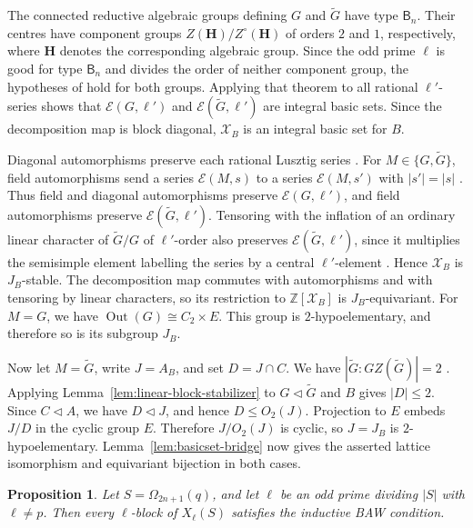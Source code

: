 \documentclass[10pt]{amsart}
\newtheorem{proposition}[theorem]{Proposition}
\theoremstyle{definition}
\renewcommand{\leq}{\leqslant}
\let\oldendproof\endproof
\renewenvironment{proof}[1][\proofname]{%
  \oldproof[\bfseries #1]%
}{\oldendproof}
\DeclareMathOperator{\Out}{Out}
\numberwithin{equation}{section}
\numberwithin{table}{section}
\begin{document}
\begin{proof}
The connected reductive algebraic groups defining $G$ and $\widetilde G$
have type $\mathsf B_n$.  Their centres have component groups
$Z(\mathbf H)/Z^\circ(\mathbf H)$ of orders $2$ and $1$, respectively,
where $\mathbf H$ denotes the corresponding algebraic group.
Since the odd prime $\ell$ is good for type $\mathsf B_n$ and
divides the order of neither component group, the hypotheses
of \cite[Theorem~2.3]{FengLiZhang2022TypeB} hold for both groups.  Applying that theorem to all rational $\ell'$-series
shows that $\mathcal E(G,\ell')$ and $\mathcal E(\widetilde G,\ell')$
are integral basic sets.  Since the decomposition map is block diagonal,
$\mathcal X_B$ is an integral basic set for $B$.

Diagonal automorphisms preserve each rational Lusztig series
\cite[Proposition~15.6(i)]{CabanesEnguehard2004}. For
$M\in\{G,\widetilde G\}$, field automorphisms send a series
$\mathcal E(M,s)$ to a series $\mathcal E(M,s')$ with $|s'|=|s|$
\cite[Proposition~7.2]{Taylor2018Automorphisms}. Thus field and diagonal
automorphisms preserve $\mathcal E(G,\ell')$, and field automorphisms
preserve $\mathcal E(\widetilde G,\ell')$.
Tensoring with the inflation of an ordinary linear character of
$\widetilde G/G$ of $\ell'$-order also preserves
$\mathcal E(\widetilde G,\ell')$, since it multiplies the semisimple
element labelling the series by a central $\ell'$-element
\cite[Theorem~4.7.1(3)]{GeckMalle2020}.
Hence $\mathcal X_B$ is $J_B$-stable.  The decomposition map commutes
with automorphisms and with tensoring by linear characters, so its
restriction to $\mathbb Z[\mathcal X_B]$ is $J_B$-equivariant.
For $M=G$, we have
$\Out(G)\cong C_2\times E$.  This group is $2$-hypoelementary, and
therefore so is its subgroup $J_B$.

Now let $M=\widetilde G$, write $J=A_B$, and set $D=J\cap C$.
We have $|\widetilde G:GZ(\widetilde G)|=2$
\cite[proof of Lemma~5.16]{FengLiZhang2022TypeB}.
Applying Lemma~\ref{lem:linear-block-stabilizer} to
$G\lhd\widetilde G$ and $B$ gives $|D|\leq2$.
Since $C\lhd A$, we have $D\lhd J$, and hence $D\leq O_2(J)$.
Projection to $E$ embeds $J/D$ in the cyclic group $E$.
Therefore $J/O_2(J)$ is cyclic, so $J=J_B$ is $2$-hypoelementary.
Lemma~\ref{lem:basicset-bridge} now gives the asserted lattice isomorphism
and equivariant bijection in both cases.
\end{proof}

\begin{proposition}\label{prop:type-b-odd-primes}
Let $S=\Omega_{2n+1}(q)$, and let $\ell$ be an odd prime dividing
$|S|$ with $\ell\ne p$.
Then every $\ell$-block of $X_\ell(S)$ satisfies the inductive BAW
condition.
\end{proposition}
\end{document}

